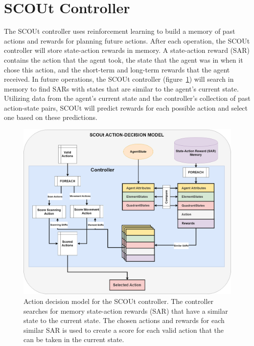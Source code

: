\section{SCOUt Controller} \label{sec:scout_controller}
The SCOUt controller uses reinforcement learning to build a memory of past actions and rewards for planning future actions.
After each operation, the SCOUt controller will store state-action rewards in memory.
A state-action reward (SAR) contains the action that the agent took, the state that the agent was in when it chose this action, and the short-term and long-term rewards that the agent received.
In future operations, the SCOUt controller (figure~\ref{fig:scout_decision_model}) will search in memory to find SARs with states that are similar to the agent's current state.
Utilizing data from the agent's current state and the controller's collection of past action-state pairs, SCOUt will predict rewards for each possible action and select one based on these predictions.

\begin{figure}[!htb]
  \centering
  \includegraphics[width=1.0\columnwidth]{Figures/scout_decision_model.png}
  \caption[SCOUt Control Model]{Action decision model for the SCOUt controller. The controller searches for memory state-action rewards (SAR) that have a similar state to the current state. The chosen actions and rewards for each similar SAR is used to create a score for each valid action that the can be taken in the current state.}
  \label{fig:scout_decision_model}
\end{figure}

